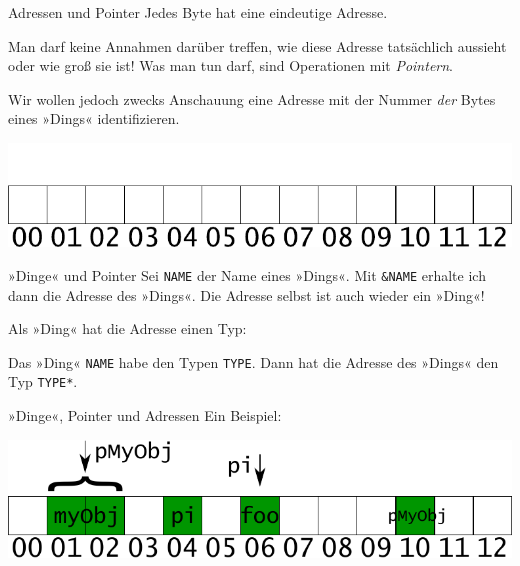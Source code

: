 \begin{frame}[fragile]{Adressen und Pointer}
	Jedes Byte hat eine eindeutige Adresse.
	
	Man darf keine Annahmen darüber treffen, wie diese Adresse tatsächlich aussieht oder wie groß sie ist!
	Was man tun darf, sind Operationen mit \emph{Pointern}.
	
	\pause
	
	Wir wollen jedoch zwecks Anschauung eine Adresse mit der Nummer \emph{der} Bytes eines »Dings« identifizieren.
	
	\includegraphics[width=\linewidth]{images/free}
\end{frame}

\begin{frame}[fragile]{»Dinge« und Pointer}
	Sei \verb|NAME| der Name eines »Dings«. Mit \verb|&NAME| erhalte ich dann die Adresse des »Dings«. Die Adresse selbst ist auch wieder ein »Ding«!
	
	\vspace{1em}
	\pause
	
	Als »Ding« hat die Adresse einen Typ:
	{\footnotesize
	\begin{block}{}
		
	\end{block}
	}
	
	\pause
	
	Das »Ding« \verb|NAME| habe den Typen \verb|TYPE|. Dann hat die Adresse des »Dings« den Typ \verb|TYPE*|.
\end{frame}

\begin{frame}[fragile]{»Dinge«, Pointer und Adressen}
	Ein Beispiel:
	
	{\footnotesize
	\begin{block}{}
		
	\end{block}
	}
	
	\pause
	\vspace{1em}
	
	\includegraphics[width=\linewidth]{images/object_points_addr}
\end{frame}


